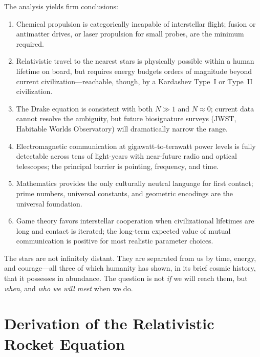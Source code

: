 \documentclass[12pt,a4paper]{article}
\begin{document}
The analysis yields firm conclusions:
\begin{enumerate}[noitemsep]
  \item Chemical propulsion is categorically incapable of interstellar flight;
    fusion or antimatter drives, or laser propulsion for small probes, are the
    minimum required.
  \item Relativistic travel to the nearest stars is physically possible within
    a human lifetime on board, but requires energy budgets orders of magnitude
    beyond current civilization---reachable, though, by a Kardashev Type~I or
    Type~II civilization.
  \item The Drake equation is consistent with both $N \gg 1$ and $N \approx 0$;
    current data cannot resolve the ambiguity, but future biosignature surveys
    (JWST, Habitable Worlds Observatory) will dramatically narrow the range.
  \item Electromagnetic communication at gigawatt-to-terawatt power levels is
    fully detectable across tens of light-years with near-future radio and
    optical telescopes; the principal barrier is pointing, frequency, and time.
  \item Mathematics provides the only culturally neutral language for first
    contact; prime numbers, universal constants, and geometric encodings are the
    universal foundation.
  \item Game theory favors interstellar cooperation when civilizational lifetimes
    are long and contact is iterated; the long-term expected value of mutual
    communication is positive for most realistic parameter choices.
\end{enumerate}

The stars are not infinitely distant. They are separated from us by time,
energy, and courage---all three of which humanity has shown, in its brief
cosmic history, that it possesses in abundance. The question is not \emph{if}
we will reach them, but \emph{when}, and \emph{who we will meet} when we do.

\appendix

\section{Derivation of the Relativistic Rocket Equation}
\label{app:rel_rocket}
\end{document}

